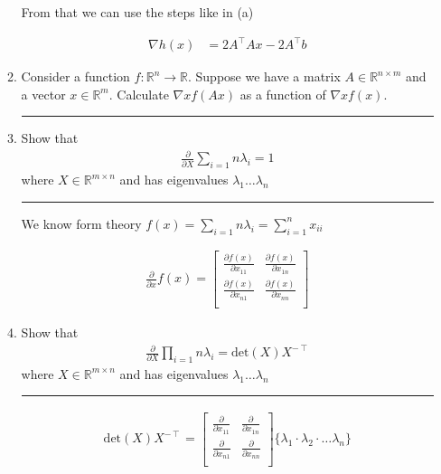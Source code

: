 \documentclass[12pt]{article}
\begin{document}
\begin{enumerate}
\begin{enumerate}
        From that we can use the steps like in (a)

        \begin{align*}
            \nabla h(x) &= 2A^\intercal Ax - 2A^\intercal b
        \end{align*}
        
        \item Consider a function $f : \mathbb{R}^n \rightarrow \mathbb{R}$. Suppose we have a matrix $A \in \mathbb{R}^{n \times m}$ and a vector $x \in \mathbb{R}^m $. Calculate $\nabla xf(Ax)$ as a function of $\nabla xf(x)$.
        
        \noindent\rule{\linewidth}{1pt}
        
        \item Show that
        \begin{align*}
            \frac{\partial}{\partial X} \sum_{i=1}{n} \lambda_i = 1
        \end{align*}
        where $X \in \mathbb{R}^{m \times n}$ and has eigenvalues $\lambda_1 \dots \lambda_n$

        \noindent\rule{\linewidth}{1pt}

        We know form theory $f(x) = \sum_{i=1}{n} \lambda_i = \sum_{i=1}^{n} x_{ii}$

        \begin{align*}
            \frac{\partial}{\partial x} f(x) = 
            \begin{bmatrix}
                \frac{\partial f(x)}{\partial x_{11}}  &   \frac{\partial f(x)}{\partial x_{1n}}  \\
                \frac{\partial f(x)}{\partial x_{n1}}  &   \frac{\partial f(x)}{\partial x_{nn}}  \\
            \end{bmatrix}
        \end{align*}

        \item Show that
        \begin{align*}
            \frac{\partial}{\partial X} \prod_{i=1}{n} \lambda_i = \textrm{det}(X)X^{-\intercal}
        \end{align*}
        where $X \in \mathbb{R}^{m \times n}$ and has eigenvalues $\lambda_1 \dots \lambda_n$

        \noindent\rule{\linewidth}{1pt}
        \begin{align*}
            \textrm{det}(X)X^{-\intercal} = \begin{bmatrix}
                \frac{\partial }{\partial x_{11}}  &   \frac{\partial }{\partial x_{1n}}  \\
                \frac{\partial }{\partial x_{n1}}  &   \frac{\partial }{\partial x_{nn}}  \\
            \end{bmatrix} \{\lambda_1 \cdot \lambda_2 \cdot \dots \lambda_n \}
        \end{align*}


\end{enumerate}
\end{enumerate}
\end{document}
